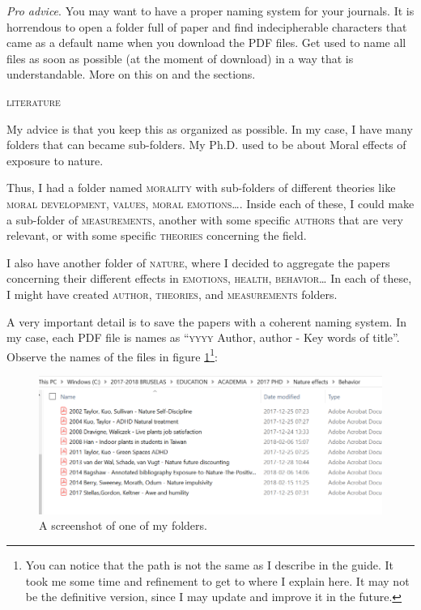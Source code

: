 \documentclass{article}
\begin{document}
\emph{Pro advice}. You may want to have a proper naming system for your journals. It is horrendous to open a folder full of paper and find indecipherable characters that came as a default name when you download the PDF files. Get used to name all files as soon as possible (at the moment of download) in a way that is understandable. More on this on  and the  sections.
\begin{center}
    \textsc{literature}
\end{center}

My advice is that you keep this as organized as possible. In my case, I have many folders that can became sub-folders. My Ph.D. used to be about Moral effects of exposure to nature.

Thus, I had a folder named \textsc{morality}  with sub-folders of different theories like \textsc{moral development}, \textsc{values}, \textsc{moral emotions}…. Inside each of these, I could make a sub-folder of \textsc{measurements}, another with some specific \textsc{authors} that are very relevant, or with some specific \textsc{theories} concerning the field.

I also have another folder of \textsc{nature}, where I decided to aggregate the papers concerning their different effects in \textsc{emotions}, \textsc{health}, \textsc{behavior}… In each of these, I might have created \textsc{author}, \textsc{theories}, and \textsc{measurements} folders.

A very important detail is to save the papers with a coherent naming system. In my case, each PDF file is names as 
``\textsc{yyyy} Author, author - Key words of title''. Observe the names of the files in figure \ref{fig: papers}\footnote{You can notice that the path is not the same as I describe in the guide. It took me some time and refinement to get to where I explain here. It may not be the definitive version, since I may update and improve it in the future.}: 

\begin{figure}
\centering
\includegraphics[width = \textwidth]{images/papers.png}
\caption{A screenshot of one of my folders.}
\label{fig: papers}
\end{figure}
\end{document}
